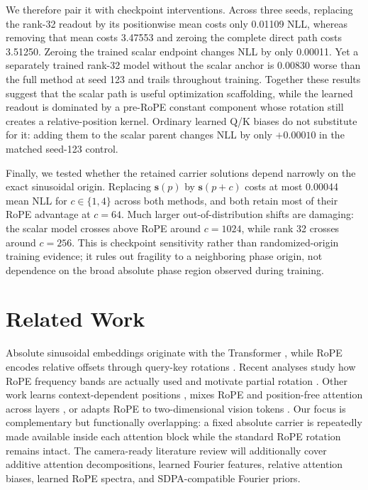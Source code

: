 \documentclass{article}
\begin{document}
We therefore pair it with checkpoint interventions. Across three seeds,
replacing the rank-32 readout by its positionwise mean costs only 0.01109 NLL,
whereas removing that mean costs 3.47553 and zeroing the complete direct path
costs 3.51250. Zeroing the trained scalar endpoint changes NLL by only
0.00011. Yet a separately trained rank-32 model without the scalar anchor is
0.00830 worse than the full method at seed 123 and trails throughout training.
Together these results suggest that the scalar path is useful optimization
scaffolding, while the learned readout is dominated by a pre-RoPE constant
component whose rotation still creates a relative-position kernel. Ordinary
learned Q/K biases do not substitute for it: adding them to the scalar parent
changes NLL by only $+0.00010$ in the matched seed-123 control.

Finally, we tested whether the retained carrier solutions depend narrowly on
the exact sinusoidal origin. Replacing $\mathbf s(p)$ by
$\mathbf s(p+c)$ costs at most 0.00044 mean NLL for $c\in\{1,4\}$ across both
methods, and both retain most of their RoPE advantage at $c=64$. Much larger
out-of-distribution shifts are damaging: the scalar model crosses above RoPE
around $c=1024$, while rank 32 crosses around $c=256$. This is checkpoint
sensitivity rather than randomized-origin training evidence; it rules out
fragility to a neighboring phase origin, not dependence on the broad absolute
phase region observed during training.

\section{Related Work}

Absolute sinusoidal embeddings originate with the Transformer
\citep{vaswani2017attention}, while RoPE encodes relative offsets through
query-key rotations \citep{su2024roformer}. Recent analyses study how RoPE
frequency bands are actually used and motivate partial rotation
\citep{barbero2025round}. Other work learns context-dependent positions
\citep{golovneva2024cope}, mixes RoPE and position-free attention across
layers \citep{yang2025ropenope}, or adapts RoPE to two-dimensional vision
tokens \citep{heo2024ropevit}. Our focus is complementary but functionally
overlapping: a fixed absolute carrier is repeatedly made available inside
each attention block while the standard RoPE rotation remains intact. The
camera-ready literature review will additionally cover additive attention
decompositions, learned Fourier features, relative attention biases, learned
RoPE spectra, and SDPA-compatible Fourier priors.
\end{document}
